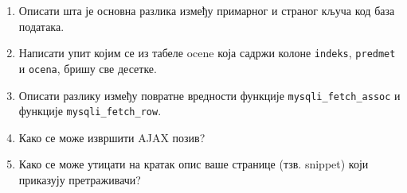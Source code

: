 \documentclass[a4paper]{article}
\begin{document}
\begin{enumerate}
\item Описати шта је основна разлика између примарног и страног кључа код
база података.

\hrulefill

\hrulefill

\hrulefill

\item Написати упит којим се из табеле ocene која садржи колоне \verb|indeks|,
\verb|predmet| и \verb|ocena|, бришу све десетке.

\hrulefill

\hrulefill

\hrulefill

\item Описати разлику између повратне вредности функције
  \verb|mysqli_fetch_assoc| и функције \verb|mysqli_fetch_row|.

\hrulefill

\hrulefill

\hrulefill

\item Како се може извршити AJAX позив?

\hrulefill

\hrulefill

\hrulefill

\item Како се може утицати на кратак опис ваше странице (тзв. snippet) који
приказују претраживачи?

\hrulefill

\hrulefill

\hrulefill
\end{enumerate}
\end{document}
